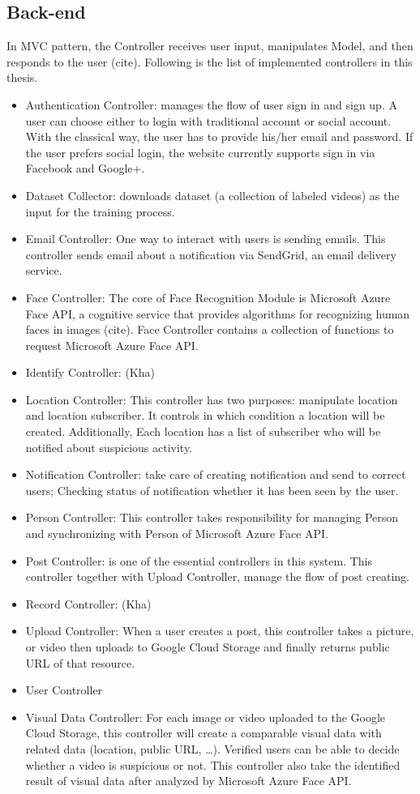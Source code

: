 \subsection{Back-end}
In MVC pattern, the Controller receives user input, manipulates Model, and then responds to the user (cite). Following is the list of implemented controllers in this thesis.
\begin{itemize}
	\item Authentication Controller: manages the flow of user sign in and sign up. A user can choose either to login with traditional account or social account. With the classical way, the user has to provide his/her email and password. If the user prefers social login, the website currently supports sign in via Facebook and Google+.
	\item Dataset Collector: downloads dataset (a collection of labeled videos) as the input for the training process.
	\item Email Controller: One way to interact with users is sending emails. This controller sends email about a notification via SendGrid, an email delivery service.
	\item Face Controller: The core of Face Recognition Module is Microsoft Azure Face API, a cognitive service that provides algorithms for recognizing human faces in images (cite). Face Controller contains a collection of functions to request Microsoft Azure Face API.
	\item Identify Controller: (Kha)
	\item Location Controller: This controller has two purposes: manipulate location and location subscriber. It controls in which condition a location will be created. Additionally, Each location has a list of subscriber who  will be notified about suspicious activity.
	\item Notification Controller:  take care of creating notification and send to correct users; Checking status of notification whether it has been seen by the user.
	\item Person Controller: This controller takes responsibility for managing Person and synchronizing with Person of Microsoft Azure Face API.
	\item Post Controller: is one of the essential controllers in this system. This controller together with Upload Controller, manage the flow of post creating.
	\item Record Controller: (Kha)
	\item Upload Controller: When a user creates a post, this controller takes a picture, or video then uploads to Google Cloud Storage and finally returns public URL of that resource.
	\item User Controller
	\item Visual Data Controller: For each image or video uploaded to the Google Cloud Storage, this controller will create a comparable visual data with related data (location, public URL, …). Verified users can be able to decide whether a video is suspicious or not. This controller also take the identified result of visual data after analyzed by Microsoft Azure Face API.
	      
\end{itemize}
